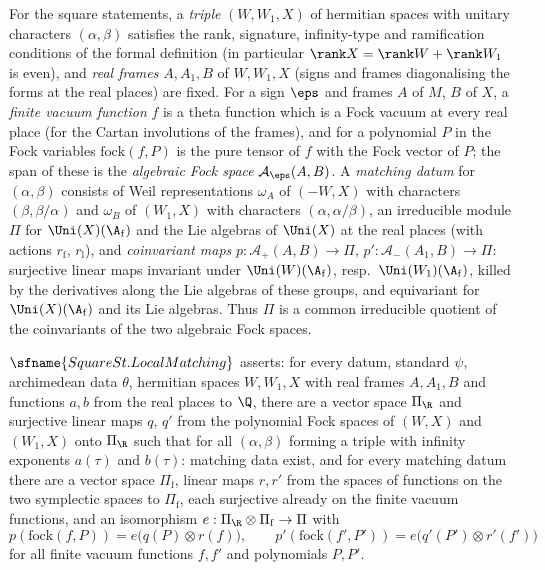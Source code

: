 For the square statements, a \emph{triple} $(W,W_1,X)$ of hermitian spaces with unitary characters $(\alpha,\beta)$ satisfies
the rank, signature, infinity-type and ramification conditions of the formal definition (in particular
$\rank X=\rank W+\rank W_1$ is even), and \emph{real frames} $A,A_1,B$ of $W,W_1,X$ (signs and frames diagonalising the forms
at the real places) are fixed. For a sign $\eps$ and frames $A$ of $M$, $B$ of $X$, a \emph{finite vacuum function} $f$ is a
theta function which is a Fock vacuum at every real place (for the Cartan involutions of the frames), and for a polynomial
$P$ in the Fock variables $\mathrm{fock}(f,P)$ is the pure tensor of $f$ with the Fock vector of $P$; the span of these is the
\emph{algebraic Fock space} $\mathcal A_\eps(A,B)$. A \emph{matching datum} for $(\alpha,\beta)$ consists of Weil
representations $\omega_A$ of $(-W,X)$ with characters $(\beta,\beta/\alpha)$ and $\omega_B$ of $(W_1,X)$ with characters
$(\alpha,\alpha/\beta)$, an irreducible module $\Pi$ for $\Uni(X)(\A_{\mathrm f})$ and the Lie algebras of $\Uni(X)$ at the
real places (with actions $r_{\mathrm f}$, $r_{\mathrm l}$), and \emph{coinvariant maps} $p:\mathcal A_+(A,B)\to\Pi$,
$p':\mathcal A_-(A_1,B)\to\Pi$: surjective linear maps invariant under $\Uni(W)(\A_{\mathrm f})$, resp.\
$\Uni(W_1)(\A_{\mathrm f})$, killed by the derivatives along the Lie algebras of these groups, and equivariant for
$\Uni(X)(\A_{\mathrm f})$ and its Lie algebras. Thus $\Pi$ is a common irreducible quotient of the coinvariants of the two
algebraic Fock spaces.

\begin{definition}[Square local matching]\label{pf:sh-theta:sqlm}
$\sfname{SquareSt.LocalMatching}$ asserts: for every datum, standard $\psi$, archimedean data $\theta$, hermitian spaces
$W,W_1,X$ with real frames $A,A_1,B$ and functions $a,b$ from the real places to $\Q$, there are a vector space $\Pi_\R$ and
surjective linear maps $q$, $q'$ from the polynomial Fock spaces of $(W,X)$ and $(W_1,X)$ onto $\Pi_\R$ such that for all
$(\alpha,\beta)$ forming a triple with infinity exponents $a(\tau)$ and $b(\tau)$: matching data exist, and for every matching
datum there are a vector space $\Pi_{\mathrm f}$, linear maps $r,r'$ from the spaces of functions on the two symplectic
spaces to $\Pi_{\mathrm f}$, each surjective already on the finite vacuum functions, and an isomorphism
$e:\Pi_\R\otimes\Pi_{\mathrm f}\to\Pi$ with
\[
p(\mathrm{fock}(f,P))=e\bigl(q(P)\otimes r(f)\bigr),\qquad p'(\mathrm{fock}(f',P'))=e\bigl(q'(P')\otimes r'(f')\bigr)
\]
for all finite vacuum functions $f,f'$ and polynomials $P,P'$.
\end{definition}

